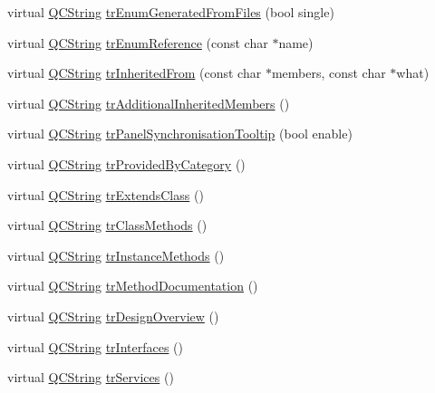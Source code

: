 \begin{DoxyCompactItemize}
\item 
virtual \hyperlink{class_q_c_string}{Q\-C\-String} \hyperlink{class_translator_slovak_a2039b9a9624800366462f980e8ebce70}{tr\-Enum\-Generated\-From\-Files} (bool single)
\item 
virtual \hyperlink{class_q_c_string}{Q\-C\-String} \hyperlink{class_translator_slovak_a0209ef4cc7768fc9abf62f7ffc95534e}{tr\-Enum\-Reference} (const char $\ast$name)
\item 
virtual \hyperlink{class_q_c_string}{Q\-C\-String} \hyperlink{class_translator_slovak_af8b8b1bb56a7ea74b11dad76e644968e}{tr\-Inherited\-From} (const char $\ast$members, const char $\ast$what)
\item 
virtual \hyperlink{class_q_c_string}{Q\-C\-String} \hyperlink{class_translator_slovak_a62da1a83afa60109108fba6ad327a06f}{tr\-Additional\-Inherited\-Members} ()
\item 
virtual \hyperlink{class_q_c_string}{Q\-C\-String} \hyperlink{class_translator_slovak_a1800c322fe577f6dfab2ab8eb463a78e}{tr\-Panel\-Synchronisation\-Tooltip} (bool enable)
\item 
virtual \hyperlink{class_q_c_string}{Q\-C\-String} \hyperlink{class_translator_slovak_a48bb5cf8c4d20b9215921504ca43c8cf}{tr\-Provided\-By\-Category} ()
\item 
virtual \hyperlink{class_q_c_string}{Q\-C\-String} \hyperlink{class_translator_slovak_a943bb1d0d3cf3c3ddca3616c21f815da}{tr\-Extends\-Class} ()
\item 
virtual \hyperlink{class_q_c_string}{Q\-C\-String} \hyperlink{class_translator_slovak_a00e0dc60db9c989dad1bc310b4bdf08c}{tr\-Class\-Methods} ()
\item 
virtual \hyperlink{class_q_c_string}{Q\-C\-String} \hyperlink{class_translator_slovak_ac194051c0538db0a70504f6d11fbf9b7}{tr\-Instance\-Methods} ()
\item 
virtual \hyperlink{class_q_c_string}{Q\-C\-String} \hyperlink{class_translator_slovak_a4666cdb4ca29df1818744d88fc17e619}{tr\-Method\-Documentation} ()
\item 
virtual \hyperlink{class_q_c_string}{Q\-C\-String} \hyperlink{class_translator_slovak_a5aeee72580ed889d0f0253be39800cc8}{tr\-Design\-Overview} ()
\item 
virtual \hyperlink{class_q_c_string}{Q\-C\-String} \hyperlink{class_translator_slovak_a3e32b2fdb1d61783cd0fa4734beed3da}{tr\-Interfaces} ()
\item 
virtual \hyperlink{class_q_c_string}{Q\-C\-String} \hyperlink{class_translator_slovak_a0a0aa68d1d3b75a4b3dd395c7b624f64}{tr\-Services} ()

\end{DoxyCompactItemize}
